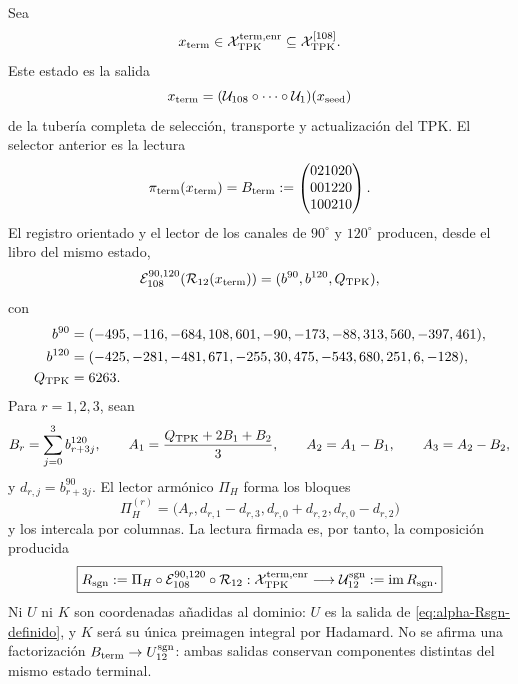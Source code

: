 \begin{definition}
Sea
\[
 x_{\rm term}\in\mathcal X_{\rm TPK}^{\rm term,enr}
 \subseteq\mathcal X_{\rm TPK}^{[108]}.
\]
Este estado es la salida
\[
 x_{\rm term}
 =(\mathcal U_{108}\circ\cdots\circ\mathcal U_1)(x_{\rm seed})
\]
de la tubería completa de selección, transporte y actualización del TPK.
El selector anterior es la lectura
\[
 \pi_{\rm term}(x_{\rm term})
 =B_{\rm term}
 :=\begin{pmatrix}021020\\001220\\100210\end{pmatrix}.
\]
El registro orientado y el lector de los canales de \(90^\circ\) y
\(120^\circ\) producen, desde el libro del mismo estado,
\begin{equation}\label{eq:alpha-subespacio-firmado}
 \mathcal E_{108}^{90,120}\!
 \left(\mathcal R_{12}(x_{\rm term})\right)
 =(b^{90},b^{120},Q_{\rm TPK}),
\end{equation}
con
\[
\begin{aligned}
 b^{90}={}&(-495,-116,-684,108,601,-90,
             -173,-88,313,560,-397,461),\\
 b^{120}={}&(-425,-281,-481,671,-255,30,
              475,-543,680,251,6,-128),\\
 Q_{\rm TPK}={}&6263.
\end{aligned}
\]
Para \(r=1,2,3\), sean
\[
 B_r=\sum_{j=0}^{3}b^{120}_{r+3j},\qquad
 A_1=\frac{Q_{\rm TPK}+2B_1+B_2}{3},\qquad
 A_2=A_1-B_1,\qquad A_3=A_2-B_2,
\]
y \(d_{r,j}=b^{90}_{r+3j}\). El lector armónico \(\Pi_H\) forma los
bloques
\begin{equation}\label{eq:alpha-modulo-imagen-H12}
 \Pi_H^{(r)}
 =\bigl(A_r,d_{r,1}-d_{r,3},
              d_{r,0}+d_{r,2},d_{r,0}-d_{r,2}\bigr)
\end{equation}
y los intercala por columnas. La lectura firmada es, por tanto, la
composición producida
\begin{equation}\label{eq:alpha-Rsgn-definido}
 \boxed{
 R_{\rm sgn}:=
 \Pi_H\circ\mathcal E_{108}^{90,120}\circ\mathcal R_{12}:
 \mathcal X_{\rm TPK}^{\rm term,enr}
 \longrightarrow
 \mathcal U_{12}^{\rm sgn}:=\operatorname{im}R_{\rm sgn}.}
\end{equation}
Ni \(U\) ni \(K\) son coordenadas añadidas al dominio: \(U\) es la salida
de \eqref{eq:alpha-Rsgn-definido}, y \(K\) será su única preimagen integral
por Hadamard.
No se afirma una factorización
\(B_{\rm term}\to U_{12}^{\rm sgn}\): ambas salidas conservan componentes
distintas del mismo estado terminal.


\end{definition}
